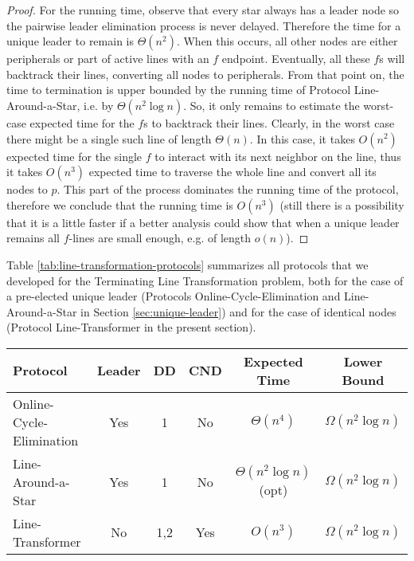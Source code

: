 \documentclass[preprint]{elsarticle}
\begin{document}
\begin{proof}
For the running time, observe that every star always has a leader node so the pairwise leader elimination process is never delayed. Therefore the time for a unique leader to remain is $\Theta(n^2)$. When this occurs, all other nodes are either peripherals or part of active lines with an $f$ endpoint. Eventually, all these $f$s will backtrack their lines, converting all nodes to peripherals. From that point on, the time to termination is upper bounded by the running time of Protocol Line-Around-a-Star, i.e. by $\Theta(n^2\log n)$. So, it only remains to estimate the worst-case expected time for the $f$s to backtrack their lines. Clearly, in the worst case there might be a single such line of length $\Theta(n)$. In this case, it takes $O(n^2)$ expected time for the single $f$ to interact with its next neighbor on the line, thus it takes $O(n^3)$ expected time to traverse the whole line and convert all its nodes to $p$. This part of the process dominates the running time of the protocol, therefore we conclude that the running time is $O(n^3)$ (still there is a possibility that it is a little faster if a better analysis could show that when a unique leader remains all $f$-lines are small enough, e.g. of length $o(n)$). 
\end{proof}

Table \ref{tab:line-transformation-protocols} summarizes all protocols that we developed for the Terminating Line Transformation problem, both for the case of a pre-elected unique leader (Protocols Online-Cycle-Elimination and Line-Around-a-Star in Section \ref{sec:unique-leader}) and for the case of identical nodes (Protocol Line-Transformer in the present section).

\begin{table*}[!hbtp]
\normalsize
\setlength{\tabcolsep}{10pt}
\begin{center}
\begin{tabular}{  l  c c c c c  }
  \hline
  Protocol & Leader & DD & CND & Expected Time & Lower Bound \\ \hline
  Online-Cycle-Elimination & Yes & 1 & No & $\Theta(n^4)$ & $\Omega(n^2\log n)$ \\ 
  Line-Around-a-Star & Yes & 1 & No & $\Theta(n^2\log n)$ (opt) & $\Omega(n^2\log n)$ \\
  Line-Transformer & No & 1,2 & Yes& $O(n^3)$ & $\Omega(n^2\log n)$ \\ \hline
\end{tabular}
\end{center}
\caption{All protocols developed in this work for the Terminating Line Transformation problem. For each of these protocols, the table shows whether it makes use of a pre-elected unique leader, what local degree detection it uses (DD), whether it uses common neighbor detection (CND), and also its expected running time under the uniform random scheduler. The last column shows the best known lower bound for the problem.}
\label{tab:line-transformation-protocols}
\end{table*}
\end{document}
